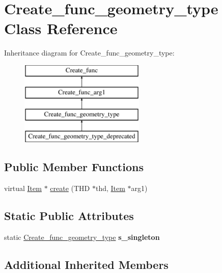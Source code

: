 \hypertarget{classCreate__func__geometry__type}{}\section{Create\+\_\+func\+\_\+geometry\+\_\+type Class Reference}
\label{classCreate__func__geometry__type}
Inheritance diagram for Create\+\_\+func\+\_\+geometry\+\_\+type\+:\begin{figure}[H]
\begin{center}
\leavevmode
\includegraphics[height=4.000000cm]{classCreate__func__geometry__type}
\end{center}
\end{figure}
\subsection*{Public Member Functions}
\begin{DoxyCompactItemize}
\item 
virtual \mbox{\hyperlink{classItem}{Item}} $\ast$ \mbox{\hyperlink{classCreate__func__geometry__type_ae46eece4f49db39b3919df6fcf83752a}{create}} (T\+HD $\ast$thd, \mbox{\hyperlink{classItem}{Item}} $\ast$arg1)
\end{DoxyCompactItemize}
\subsection*{Static Public Attributes}
\begin{DoxyCompactItemize}
\item 
\mbox{\label{classCreate__func__geometry__type_aa69c9d4d43a95d1f6d8e30ebf4a5092d}} 
static \mbox{\hyperlink{classCreate__func__geometry__type}{Create\+\_\+func\+\_\+geometry\+\_\+type}} {\bfseries s\+\_\+singleton}
\end{DoxyCompactItemize}
\subsection*{Additional Inherited Members}


